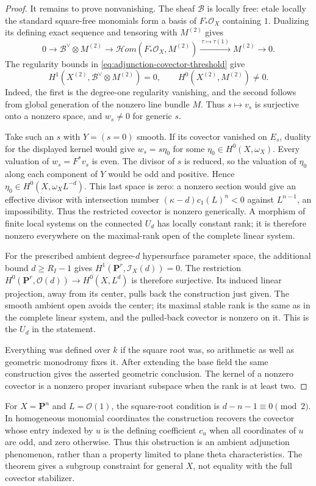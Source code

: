 \begin{proof}
It remains to prove nonvanishing.  The sheaf $\mathcal B$ is
locally free: etale locally the standard square-free
monomials form a basis of $F_*\mathcal O_X$ containing $1$.
Dualizing its defining exact sequence and tensoring with
$M^{(2)}$ gives
\[
 0\longrightarrow\mathcal B^\vee\otimes M^{(2)}
 \longrightarrow\mathcal Hom(F_*\mathcal O_X,M^{(2)})
 \xrightarrow{\ \tau\mapsto\tau(1)\ } M^{(2)}
 \longrightarrow0.
\]
The regularity bounds in
\eqref{eq:adjunction-covector-threshold} give
\[
 H^1(X^{(2)},\mathcal B^\vee\otimes M^{(2)})=0,
       \qquad H^0(X^{(2)},M^{(2)})\ne0.
\]
Indeed, the first is the degree-one regularity vanishing,
and the second follows from global generation of the
nonzero line bundle $M$.  Thus $s\mapsto v_s$ is surjective
onto a nonzero space, and $w_s\ne0$ for generic $s$.

Take such an $s$ with $Y=(s=0)$ smooth.  If its covector
vanished on $E_s$, duality for the displayed kernel would
give $w_s=s\eta_0$ for some $\eta_0\in H^0(X,\omega_X)$.
Every valuation of $w_s=F^*v_s$ is even.  The divisor of
$s$ is reduced, so the valuation of $\eta_0$ along each
component of $Y$ would be odd and positive.  Hence
$\eta_0\in H^0(X,\omega_X L^{-d})$.  This last space is zero:
a nonzero section would give an effective divisor with
intersection number $(\kappa-d)c_1(L)^n<0$ against
$L^{n-1}$, an impossibility.  Thus the restricted covector
is nonzero generically.  A morphism of finite local
systems on the connected $U_d$ has locally constant rank;
it is therefore nonzero everywhere on the maximal-rank open
of the complete linear system.

For the prescribed ambient degree-$d$ hypersurface parameter
space, the additional bound $d\geq R_I-1$ gives
$H^1(\mathbf P^r,\mathcal I_X(d))=0$.  The restriction
$H^0(\mathbf P^r,\mathcal O(d))\to H^0(X,L^d)$ is therefore
surjective.  Its induced linear projection, away from its
center, pulls back the construction just given.  The smooth
ambient open avoids the center; its maximal stable rank is
the same as in the complete linear system, and the pulled-back
covector is nonzero on it.  This is the $U_d$ in the statement.

Everything was defined over $k$ if the square root was,
so arithmetic as well as geometric monodromy fixes it.
After extending the base field the same construction
gives the asserted geometric conclusion.  The kernel
of a nonzero covector is a nonzero proper invariant
subspace when the rank is at least two.
\end{proof}

\begin{remark}\label{rem:adjunction-square-Pn}
For $X=\mathbf P^n$ and $L=\mathcal O(1)$, the square-root
condition is $d-n-1\equiv0\pmod2$.  In homogeneous
monomial coordinates the construction recovers the
covector whose entry indexed by $u$ is the defining
coefficient $c_u$ when all coordinates of $u$ are odd,
and zero otherwise.  Thus this obstruction is an
ambient adjunction phenomenon, rather than a property
limited to plane theta characteristics.
The theorem gives a subgroup constraint for general
$X$, not equality with the full covector stabilizer.
\end{remark}
